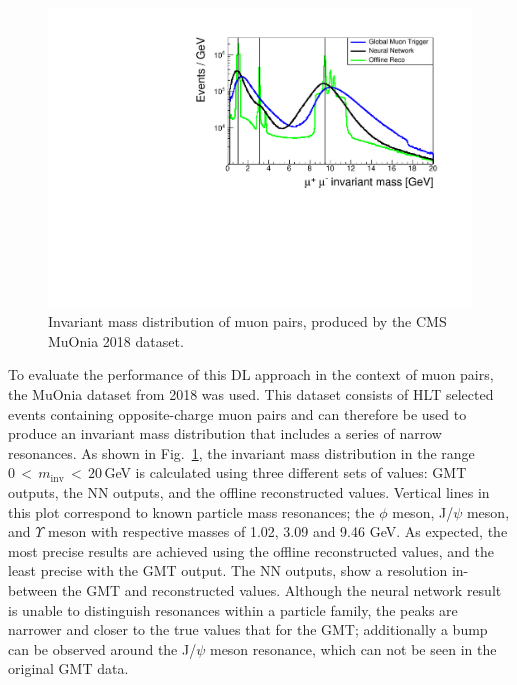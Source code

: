 \documentclass[10pt, paper=a4, UKenglish]{article}
\begin{document}
\begin{figure}[!htb]
    \centering
    \includegraphics[width=0.72\linewidth]{./images/inv_mass_total_lines_2.pdf}
    \caption{Invariant mass distribution of muon pairs, produced by the CMS MuOnia 2018 dataset.}
    \label{fig:inv_mass}
\end{figure}


To evaluate the performance of this DL approach in the context of muon pairs, the MuOnia dataset from 2018 was used. This dataset consists of HLT selected events containing opposite-charge muon pairs and can therefore be used to produce an invariant mass distribution that includes a series of narrow resonances. As shown in Fig.~\ref{fig:inv_mass}, the invariant mass distribution in the range $0\,<\,m_\mathrm{inv}\,<\,20$\,GeV is calculated using three different sets of values: GMT outputs, the NN outputs, and the offline reconstructed values. Vertical lines in this plot correspond to known particle mass resonances; the $\phi$ meson, J/$\psi$ meson, and $\Upsilon$ meson with respective masses of 1.02, 3.09 and 9.46 GeV. As expected, the most precise results are achieved using the offline reconstructed values, and the least precise with the GMT output. The NN outputs, show a resolution in-between the GMT and reconstructed values. Although the neural network result is unable to distinguish resonances within a particle family, the peaks are narrower and closer to the true values that for the GMT; additionally a bump can be observed around the J/$\psi$ meson resonance, which can not be seen in the original GMT data.
\end{document}
